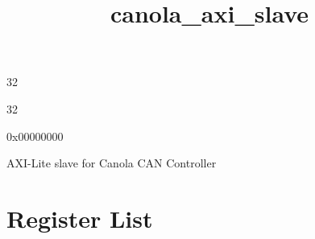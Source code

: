 \documentclass{article}
\title{canola{\_}axi{\_}slave}
\author{}
\date{}
\begin{document}
\maketitle

\begin{description}[leftmargin=!,labelwidth=\widthof{\bfseries Address width: }]
\item [Address width: ] 32
\item [Data width: ] 32
\item [Base address: ] 0x00000000
\end{description}


AXI-Lite slave for Canola CAN Controller

\section{Register List}
\end{document}
